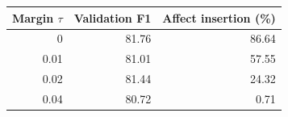 \begin{tabular}{rrr}
\toprule
Margin $\tau$ & Validation F1 & Affect insertion (\%) \\
\midrule
0 & 81.76 & 86.64 \\
0.01 & 81.01 & 57.55 \\
0.02 & 81.44 & 24.32 \\
0.04 & 80.72 & 0.71 \\
\bottomrule
\end{tabular}
